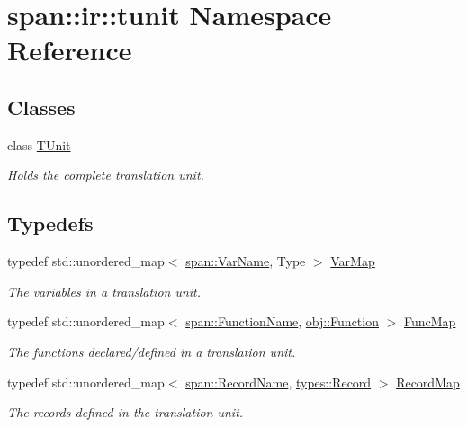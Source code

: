 \hypertarget{namespacespan_1_1ir_1_1tunit}{}\section{span\+:\+:ir\+:\+:tunit Namespace Reference}
\label{namespacespan_1_1ir_1_1tunit}
\subsection*{Classes}
\begin{DoxyCompactItemize}
\item 
class \hyperlink{classspan_1_1ir_1_1tunit_1_1TUnit}{T\+Unit}
\begin{DoxyCompactList}\small\item\em Holds the complete translation unit. \end{DoxyCompactList}\end{DoxyCompactItemize}
\subsection*{Typedefs}
\begin{DoxyCompactItemize}
\item 
typedef std\+::unordered\+\_\+map$<$ \hyperlink{namespacespan_adc1e351442e4f323d37dbbb8736d003f}{span\+::\+Var\+Name}, Type $>$ \hyperlink{namespacespan_1_1ir_1_1tunit_ab87decca6ee3f2091cb24b47d831aa44}{Var\+Map}
\begin{DoxyCompactList}\small\item\em The variables in a translation unit. \end{DoxyCompactList}\item 
typedef std\+::unordered\+\_\+map$<$ \hyperlink{namespacespan_a5184c08609df37077d47e497f83aadd1}{span\+::\+Function\+Name}, \hyperlink{classspan_1_1ir_1_1obj_1_1Function}{obj\+::\+Function} $>$ \hyperlink{namespacespan_1_1ir_1_1tunit_a8c9ac0f8660f3f103f7b1ecb106b583b}{Func\+Map}
\begin{DoxyCompactList}\small\item\em The functions declared/defined in a translation unit. \end{DoxyCompactList}\item 
typedef std\+::unordered\+\_\+map$<$ \hyperlink{namespacespan_a556ddaab2ad6c39fb1d89fb38182fe57}{span\+::\+Record\+Name}, \hyperlink{classspan_1_1ir_1_1types_1_1Record}{types\+::\+Record} $>$ \hyperlink{namespacespan_1_1ir_1_1tunit_a466edb24fa3caa23d32ca7bc2cdeac12}{Record\+Map}
\begin{DoxyCompactList}\small\item\em The records defined in the translation unit. \end{DoxyCompactList}\end{DoxyCompactItemize}


